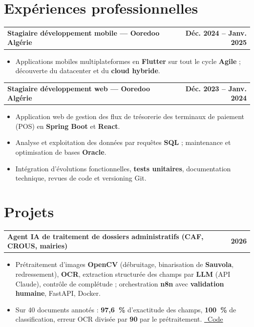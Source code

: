 \documentclass[a4paper,10pt]{article}
\makeatletter
\newenvironment{joblong}[2]
{\begin{tabularx}{\linewidth}{@{}X r@{}}\textbf{#1} & \textbf{#2}\\[2pt]\end{tabularx}\begin{itemize}}
{\end{itemize}}
\makeatother
\begin{document}
\section{Expériences professionnelles}

\begin{joblong}{Stagiaire développement mobile — Ooredoo Algérie}{Déc. 2024 -- Janv. 2025}
\item Applications mobiles multiplateformes en \textbf{Flutter} sur tout le cycle \textbf{Agile} ; découverte du datacenter et du \textbf{cloud hybride}.
\end{joblong}

\begin{joblong}{Stagiaire développement web — Ooredoo Algérie}{Déc. 2023 -- Janv. 2024}
\item Application web de gestion des flux de trésorerie des terminaux de paiement (POS) en \textbf{Spring Boot} et \textbf{React}.
\item Analyse et exploitation des données par requêtes \textbf{SQL} ; maintenance et optimisation de bases \textbf{Oracle}.
\item Intégration d'évolutions fonctionnelles, \textbf{tests unitaires}, documentation technique, revues de code et versioning Git.
\end{joblong}

\section{Projets}

\begin{joblong}{Agent IA de traitement de dossiers administratifs (CAF, CROUS, mairies)}{2026}
\item Prétraitement d'images \textbf{OpenCV} (débruitage, binarisation de \textbf{Sauvola}, redressement), \textbf{OCR}, extraction structurée des champs par \textbf{LLM} (API Claude), contrôle de complétude ; orchestration \textbf{n8n} avec \textbf{validation humaine}, FastAPI, Docker.
\item Sur 40 documents annotés : \textbf{97,6~\%} d'exactitude des champs, \textbf{100~\%} de classification, erreur OCR divisée par \textbf{90} par le prétraitement. \href{https://github.com/adkebaily/agent-dossiers-administratifs}{\faGithub\ Code}
\end{joblong}
\end{document}
